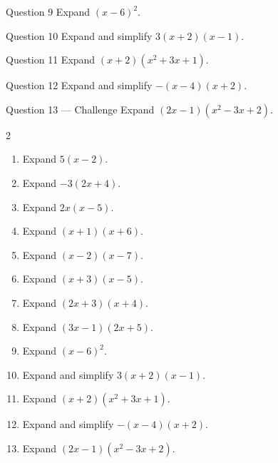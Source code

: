 \documentclass[11pt]{article}
\begin{document}
\begin{qbox}{Question 9}
Expand $(x-6)^2$.\workspace{2.0cm}
\end{qbox}

\begin{qbox}{Question 10}
Expand and simplify $3(x+2)(x-1)$.\workspace{2.2cm}
\end{qbox}

\begin{qbox}{Question 11}
Expand $(x+2)(x^2+3x+1)$.\workspace{2.4cm}
\end{qbox}

\begin{qbox}{Question 12}
Expand and simplify $-(x-4)(x+2)$.\workspace{2.2cm}
\end{qbox}

\begin{qbox}{Question 13 --- Challenge}
Expand $(2x-1)(x^2-3x+2)$.\workspace{2.8cm}
\end{qbox}

\clearpage
{}

\begin{recapbox}
\begin{multicols}{2}
\small
\begin{enumerate}[leftmargin=*,itemsep=3pt]
  \item Expand $5(x-2)$.
  \item Expand $-3(2x+4)$.
  \item Expand $2x(x-5)$.
  \item Expand $(x+1)(x+6)$.
  \item Expand $(x-2)(x-7)$.
  \item Expand $(x+3)(x-5)$.
  \item Expand $(2x+3)(x+4)$.
  \item Expand $(3x-1)(2x+5)$.
  \item Expand $(x-6)^2$.
  \item Expand and simplify $3(x+2)(x-1)$.
  \item Expand $(x+2)(x^2+3x+1)$.
  \item Expand and simplify $-(x-4)(x+2)$.
  \item Expand $(2x-1)(x^2-3x+2)$.
\end{enumerate}
\end{multicols}
\end{recapbox}
\end{document}
